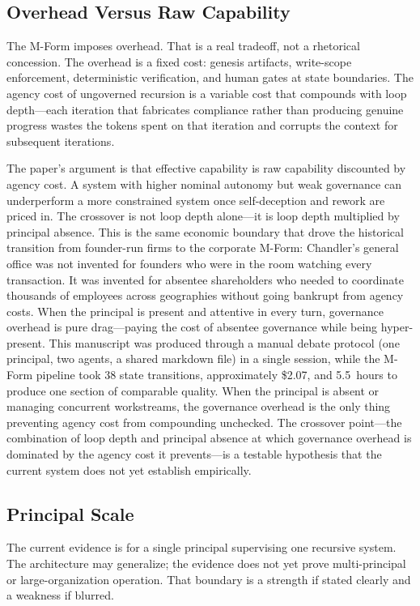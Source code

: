 \documentclass[11pt]{article}
\begin{document}
\subsection{Overhead Versus Raw Capability}

The M-Form imposes overhead. That is a real tradeoff, not a rhetorical concession. The overhead is a fixed cost: genesis artifacts, write-scope enforcement, deterministic verification, and human gates at state boundaries. The agency cost of ungoverned recursion is a variable cost that compounds with loop depth---each iteration that fabricates compliance rather than producing genuine progress wastes the tokens spent on that iteration and corrupts the context for subsequent iterations.

The paper's argument is that effective capability is raw capability discounted by agency cost. A system with higher nominal autonomy but weak governance can underperform a more constrained system once self-deception and rework are priced in. The crossover is not loop depth alone---it is loop depth multiplied by principal absence. This is the same economic boundary that drove the historical transition from founder-run firms to the corporate M-Form: Chandler's general office was not invented for founders who were in the room watching every transaction. It was invented for absentee shareholders who needed to coordinate thousands of employees across geographies without going bankrupt from agency costs. When the principal is present and attentive in every turn, governance overhead is pure drag---paying the cost of absentee governance while being hyper-present. This manuscript was produced through a manual debate protocol (one principal, two agents, a shared markdown file) in a single session, while the M-Form pipeline took 38 state transitions, approximately \$2.07, and 5.5~hours to produce one section of comparable quality. When the principal is absent or managing concurrent workstreams, the governance overhead is the only thing preventing agency cost from compounding unchecked. The crossover point---the combination of loop depth and principal absence at which governance overhead is dominated by the agency cost it prevents---is a testable hypothesis that the current system does not yet establish empirically.

\subsection{Principal Scale}

The current evidence is for a single principal supervising one recursive system. The architecture may generalize; the evidence does not yet prove multi-principal or large-organization operation. That boundary is a strength if stated clearly and a weakness if blurred.
\end{document}
